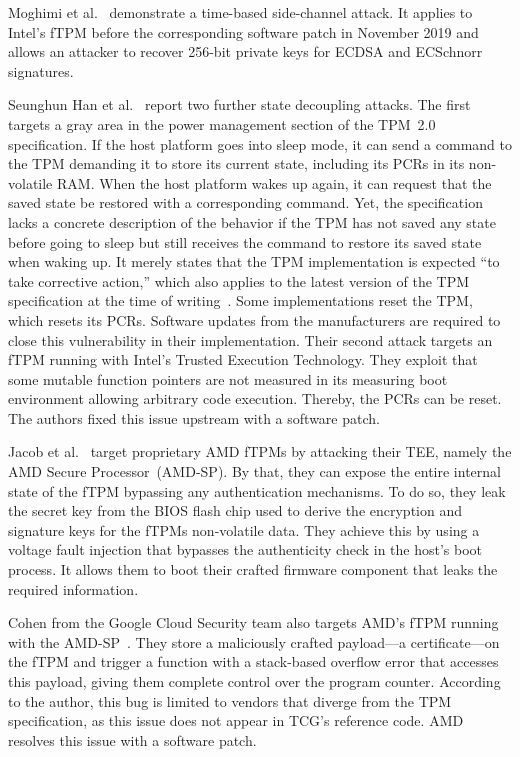 Moghimi et al.~\cite{Moghimi2019} demonstrate a time-based side-channel attack.
It applies to Intel's \ac{fTPM} before the corresponding software patch in November 2019 and allows an attacker to recover 256-bit private keys for ECDSA and ECSchnorr signatures.

Seunghun Han et al.~\cite{aBadDream} report two further state decoupling attacks.
The first targets a gray area in the power management section of the TPM~2.0 specification.
If the host platform goes into sleep mode, it can send a command to the \ac{TPM} demanding it to store its current state, including its \acp{PCR} in its non-volatile RAM\@.
When the host platform wakes up again, it can request that the saved state be restored with a corresponding command.
Yet, the specification lacks a concrete description of the behavior if the \ac{TPM} has not saved any state before going to sleep but still receives the command to restore its saved state when waking up.
It merely states that the \ac{TPM} implementation is expected ``to take corrective action,'' which also applies to the latest version of the \ac{TPM} specification at the time of writing~\cite{tpm20}.
Some implementations reset the \ac{TPM}, which resets its \acp{PCR}.
Software updates from the manufacturers are required to close this vulnerability in their implementation.
Their second attack targets an \ac{fTPM} running with Intel's Trusted Execution Technology.
They exploit that some mutable function pointers are not measured in its measuring boot environment allowing arbitrary code execution.
Thereby, the \acp{PCR} can be reset.
The authors fixed this issue upstream with a software patch.

Jacob et al.~\cite{Jacob2023} target proprietary AMD fTPMs by attacking their \ac{TEE}, namely the AMD Secure Processor~(AMD-SP).
By that, they can expose the entire internal state of the \ac{fTPM} bypassing any authentication mechanisms.
To do so, they leak the secret key from the BIOS flash chip used to derive the encryption and signature keys for the \acp{fTPM} non-volatile data.
They achieve this by using a voltage fault injection that bypasses the authenticity check in the host's boot process.
It allows them to boot their crafted firmware component that leaks the required information.

Cohen from the Google Cloud Security team also targets AMD's fTPM running with the AMD-SP~\cite{cohen}.
They store a maliciously crafted payload---a certificate---on the \ac{fTPM} and trigger a function with a stack-based overflow error that accesses this payload, giving them complete control over the program counter.
According to the author, this bug is limited to vendors that diverge from the \ac{TPM} specification, as this issue does not appear in \ac{TCG}'s reference code.
AMD resolves this issue with a software patch.

